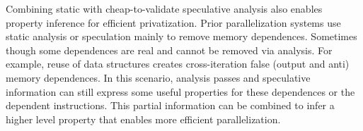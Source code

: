 Combining static with cheap-to-validate speculative analysis also enables
property inference for efficient privatization.
%
Prior parallelization systems
use static analysis or speculation mainly to remove memory dependences.
Sometimes though some dependences are real and cannot be removed via analysis.
For example, reuse of data structures creates cross-iteration false (output and
anti) memory dependences.
%
In this scenario, analysis passes and speculative information can still express
some useful properties for these dependences or the dependent instructions.
This partial information can be combined to infer a higher level property that
enables more efficient parallelization.


%
%
%

%
%

